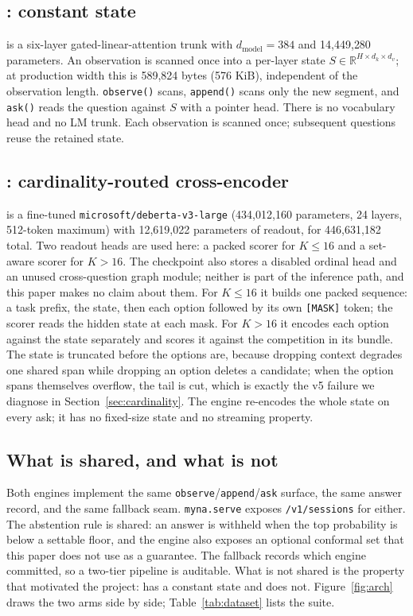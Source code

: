 \subsection{\stream{}: constant state}
\stream{} is a six-layer gated-linear-attention trunk with $d_{\text{model}}=384$ and 14{,}449{,}280 parameters. An observation is scanned once into a per-layer state $S\in\mathbb{R}^{H\times d_k\times d_v}$; at production width this is 589{,}824 bytes (576 KiB), independent of the observation length. \texttt{observe()} scans, \texttt{append()} scans only the new segment, and \texttt{ask()} reads the question against $S$ with a pointer head. There is no vocabulary head and no LM trunk. Each observation is scanned once; subsequent questions reuse the retained state.

\subsection{\vsix{}: cardinality-routed cross-encoder}
\vsix{} is a fine-tuned \texttt{microsoft/deberta-v3-large} (434{,}012{,}160 parameters, 24 layers, 512-token maximum) with 12{,}619{,}022 parameters of readout, for 446{,}631{,}182 total. Two readout heads are used here: a packed scorer for $K\le16$ and a set-aware scorer for $K>16$. The checkpoint also stores a disabled ordinal head and an unused cross-question graph module; neither is part of the inference path, and this paper makes no claim about them. For $K\le16$ it builds one packed sequence: a task prefix, the state, then each option followed by its own \texttt{[MASK]} token; the scorer reads the hidden state at each mask. For $K>16$ it encodes each option against the state separately and scores it against the competition in its bundle. The state is truncated before the options are, because dropping context degrades one shared span while dropping an option deletes a candidate; when the option spans themselves overflow, the tail is cut, which is exactly the v5 failure we diagnose in Section~\ref{sec:cardinality}. The engine re-encodes the whole state on every ask; it has no fixed-size state and no streaming property.

\subsection{What is shared, and what is not}
Both engines implement the same \texttt{observe}/\texttt{append}/\texttt{ask} surface, the same answer record, and the same fallback seam. \texttt{myna.serve} exposes \texttt{/v1/sessions} for either. The abstention rule is shared: an answer is withheld when the top probability is below a settable floor, and the engine also exposes an optional conformal set that this paper does not use as a guarantee. The fallback records which engine committed, so a two-tier pipeline is auditable. What is not shared is the property that motivated the project: \stream{} has a constant state and \vsix{} does not. Figure~\ref{fig:arch} draws the two arms side by side; Table~\ref{tab:dataset} lists the suite.

